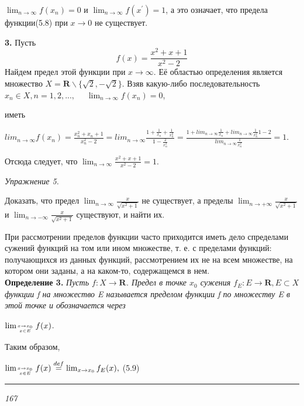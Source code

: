 \documentclass[a4paper, 16pt]{article}
\begin{document}
\thispagestyle{empty}
\begin{Large}
\noindent$\lim_{n \to \infty} f(x_{n}) = 0$ и $\lim_{n \to \infty} f(x^{'}) = 1$, а это означает, что предела
функции(5.8) при $x \to 0$ не существует.\par
\quad\textbf{3.} Пусть
\[f(x)=\frac{x^2 + x + 1}{x^2 - 2}\]
Найдем предел этой функции при $x \to \infty$. Её областью определения является множество $X = \textbf{R}\backslash\{\sqrt{2}, - \sqrt{2}\}$. Взяв какую-либо последовательность $x_{n} \in X, n=1, 2, ... ,$ $\quad\lim_{n \to \infty} f(x_{n}) = 0$,\par
{} иметь\par
\begin{center}
    $lim_{n \to \infty} f(x_{n}) = \frac{x_{n}^2 + x_{n} + 1}{x_{n}^2 - 2} = lim_{n \to \infty} \frac{1 + \frac{1}{x_{n}} + \frac{1}{x_{n}^2}
    }{1 - \frac{2}{x_{n}^2}}=\frac{1 + lim_{n \to \infty} \frac{1}{x_{n}} + lim_{n \to \infty} \frac{1}{x_{n}^2}{1 - 2}}{lim_{n \to \infty} \frac{1}{x_{n}^2}}=1$.\par
\end{center}
Отсюда следует, что $\lim_{n \to \infty}{\frac{x^2 + x + 1}{x^2 - 2}}=1.$\par
\begin{large}
    \noindent\textit{Упражнение 5.}
\end{large}
\begin{small}
    Доказать, что предел $\lim_{n \to \infty}{\frac{x}{\sqrt{x^2 + 1}}}$ не существует, а
    пределы $\lim_{n \to +\infty}{\frac{x}{\sqrt{x^2 + 1}}}$ и $\lim_{n \to -\infty}{\frac{x}{\sqrt{x^2 + 1}}}$ существуют, и найти их.\par
\end{small}
При рассмотрении пределов функции часто приходится иметь дело спределами сужений функций на том или ином множестве,
т. е. с пределами функций: получающихся из данных функций, рассмотрением их не на всем множестве, на котором они заданы,
а на каком-то, содержащемся в нем.\\
\textbf{Определение 3.}
\textit{Пусть $f:X \to \textbf{R}$. Предел в точке $x_0$ сужения $f_E:E \to \textbf{R}, E \subset X$ функции f на множество E называется
пределом функции f по множеству E в этой точке и обозначается через}\par
\begin{center}
    $\lim_{x \to x_0 \atop x \in E} f(x)$.
\end{center}
Таким образом,
\begin{flushright}
    $\lim_{x \to x_0 \atop x \in E} f(x)\overset{def}{=}\lim_{x \to x_0} f_E(x),$ \phantom{\hspace{55pt}}(5.9)\par
\end{flushright}
\begin{center}
    \rule{50pt}{0.1pt}\par
    \textit{167}
\end{center}
\end{Large}
\end{document}
